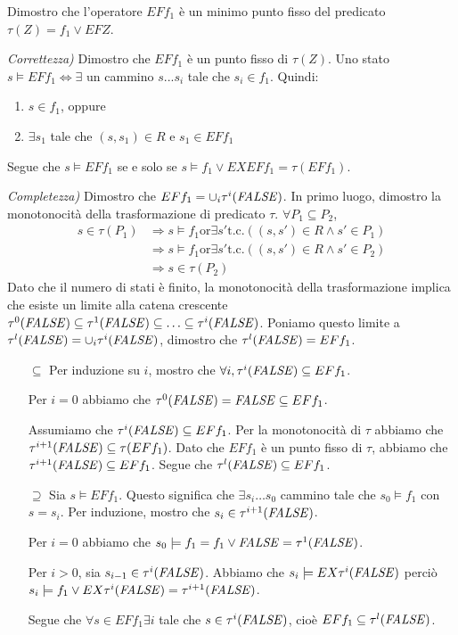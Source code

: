\documentclass[12pt]{article}
\newcommand{\F}{\ensuremath{\textrm{\emph{FALSE}}}\xspace}
\begin{document}
Dimostro che l'operatore $EF f_1$ è un minimo punto fisso del predicato $\tau(Z)=f_1 \lor EFZ$.

\medskip

\textit{Correttezza)} Dimostro che $EF f_1$ è un punto fisso di $\tau(Z)$.
Uno stato $s \models EF f_1 \Leftrightarrow \exists $ un cammino $s...s_i$ tale che $s_i \in f_1$. Quindi:
\begin{enumerate}[noitemsep]
\item $s \in f_1$, oppure
\item $\exists s_1$ tale che $(s,s_1) \in R$ e $s_1 \in EF f_1$
\end{enumerate}
Segue che $s \models EF f_1$ se e solo se $s \models f_1 \lor EXEF f_1 = \tau(EF f_1)$.

\medskip

\textit{Completezza)} Dimostro che $EF f_1 = \cup_i \tau^i(\textrm{\F})$.
In primo luogo, dimostro la monotonocità della trasformazione di predicato $\tau$. $\forall P_1 \subseteq P_2$,
\begin{align*}
s\in \tau(P_1) &\Rightarrow s \models f_1 \textrm{or} \exists s' \textrm{t.c.} ((s,s') \in R \land s' \in P_1)\\
               &\Rightarrow s \models f_1 \textrm{or} \exists s' \textrm{t.c.} ((s,s') \in R \land s' \in P_2)\\
			   &\Rightarrow s\in \tau(P_2)
\end{align*}
Dato che il numero di stati è finito, la monotonocità della trasformazione implica che esiste un limite alla catena crescente $\tau^0(\F) \subseteq \tau^1(\F) \subseteq \ldots \subseteq \tau^i(\F)$.
Poniamo questo limite a $\tau^l(\F)=\cup_i \tau^i(\F)$, dimostro che $\tau^l(\F)=EF f_1$.
\begin{itemize}
\item[$\subseteq$] Per induzione su $i$, mostro che $\forall i, \tau^i(\F) \subseteq EF f_1$.

	Per $i=0$ abbiamo che $\tau^0(\F) = \F \subseteq EF f_1$.
	
	Assumiamo che $\tau^i(\F) \subseteq EF f_1$. Per la monotonocità di $\tau$ abbiamo che $\tau^{i+1}(\F) \subseteq \tau(EF f_1)$. Dato che $EF f_1$ è un punto fisso di $\tau$, abbiamo che $\tau^{i+1}(\F) \subseteq EF f_1$. Segue che $\tau^l(\F) \subseteq EF f_1$.
\item[$\supseteq$] Sia $s \models EF f_1$. Questo significa che $\exists s_i \ldots s_0$ cammino tale che $s_0 \models f_1$ con $s = s_i$. Per induzione, mostro che $s_i \in \tau^{i+1}(\F)$.

	Per $i=0$ abbiamo che $s_0 \models f_1 = f_1 \lor \F = \tau^1(\F)$.
	
	Per $i>0$, sia $s_{i-1} \in \tau^i(\F)$. Abbiamo che $s_i \models EX\tau^i(\F)$ perciò $s_i \models f_1 \lor EX\tau^i(\F)=\tau^{i+1}(\F)$.
	
	Segue che $\forall s \in EF f_1 \exists i$ tale che $s \in \tau^i(\F)$, cioè $EF f_1 \subseteq \tau^l(\F)$.
\end{itemize}
\end{document}
